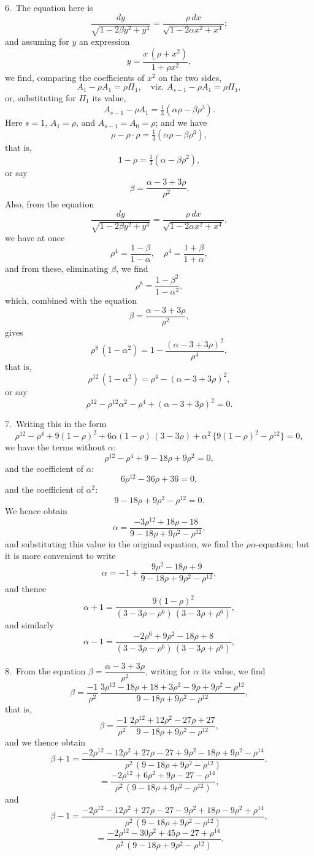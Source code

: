 \documentclass[12pt,a4paper]{article}
\theoremstyle{definition}
\begin{document}
6.\ The equation here is
\[
\frac{dy}{\sqrt{1 - 2\beta y^2 + y^4}}
= \frac{\rho\, dx}{\sqrt{1 - 2\alpha x^2 + x^4}};
\]
and assuming for $y$ an expression
\[
y = \frac{x\, (\rho + x^2)}{1 + \rho x^2},
\]
we find, comparing the coefficients of $x^2$ on the two sides,
\[
A_1 - \rho A_1 = \rho \Pi_1, \quad \text{viz. } A_{s-1} - \rho A_1 = \rho \Pi_1,
\]
or, substituting for $\Pi_1$ its value,
\[
A_{s-1} - \rho A_1 = \tfrac13(\alpha \rho - \beta \rho^3).
\]
Here $s = 1$, $A_1 = \rho$, and $A_{s-1} = A_0 = \rho$; and we have
\[
\rho - \rho \cdot \rho = \tfrac13(\alpha \rho - \beta \rho^3),
\]
that is,
\[
1 - \rho = \tfrac13(\alpha - \beta \rho^2),
\]
or say
\[
\beta = \frac{\alpha - 3 + 3\rho}{\rho^2}.
\]
Also, from the equation
\[
\frac{dy}{\sqrt{1 - 2\beta y^2 + y^4}}
= \frac{\rho\, dx}{\sqrt{1 - 2\alpha x^2 + x^4}},
\]
we have at once
\[
\rho^4 = \frac{1 - \beta}{1 - \alpha}, \quad \rho^4 = \frac{1 + \beta}{1 + \alpha},
\]
and from these, eliminating $\beta$, we find
\[
\rho^8 = \frac{1 - \beta^2}{1 - \alpha^2},
\]
which, combined with the equation
\[
\beta = \frac{\alpha - 3 + 3\rho}{\rho^2},
\]
gives
\[
\rho^8\, (1 - \alpha^2) = 1 - \frac{(\alpha - 3 + 3\rho)^2}{\rho^4},
\]
that is,
\[
\rho^{12}\, (1 - \alpha^2) = \rho^4 - (\alpha - 3 + 3\rho)^2,
\]
or say
\[
\rho^{12} - \rho^{12}\alpha^2 - \rho^4 + (\alpha - 3 + 3\rho)^2 = 0.
\]

7.\ Writing this in the form
\[
\rho^{12} - \rho^4 + 9(1 - \rho)^2 + 6\alpha(1 - \rho)\, (3 - 3\rho) + \alpha^2\, \{9(1 - \rho)^2 - \rho^{12}\} = 0,
\]
we have the terms without $\alpha$:
\[
\rho^{12} - \rho^4 + 9 - 18\rho + 9\rho^2 = 0,
\]
and the coefficient of $\alpha$:
\[
6\rho^{12} - 36\rho + 36 = 0,
\]
and the coefficient of $\alpha^2$:
\[
9 - 18\rho + 9\rho^2 - \rho^{12} = 0.
\]
We hence obtain
\[
\alpha = \frac{-3\rho^{12} + 18\rho - 18}{9 - 18\rho + 9\rho^2 - \rho^{12}},
\]
and substituting this value in the original equation, we find the $\rho\alpha$-equation; but
it is more convenient to write
\[
\alpha = -1 + \frac{9\rho^2 - 18\rho + 9}{9 - 18\rho + 9\rho^2 - \rho^{12}},
\]
and thence
\[
\alpha + 1 = \frac{9(1 - \rho)^2}{(3 - 3\rho - \rho^6)\, (3 - 3\rho + \rho^6)},
\]
and similarly
\[
\alpha - 1 = \frac{-2\rho^6 + 9\rho^2 - 18\rho + 8}{(3 - 3\rho - \rho^6)\, (3 - 3\rho + \rho^6)},
\]

8.\ From the equation $\beta = \dfrac{\alpha - 3 + 3\rho}{\rho^2}$, writing for $\alpha$ its value, we find
\[
\beta = \frac{-1}{\rho^2}\,
\frac{3\rho^{12} - 18\rho + 18 + 3\rho^2 - 9\rho + 9\rho^2 - \rho^{12}}{9 - 18\rho + 9\rho^2 - \rho^{12}},
\]
that is,
\[
\beta = \frac{-1}{\rho^2}\,
\frac{2\rho^{12} + 12\rho^2 - 27\rho + 27}{9 - 18\rho + 9\rho^2 - \rho^{12}},
\]
and we thence obtain
\[
\beta + 1 = \frac{-2\rho^{12} - 12\rho^2 + 27\rho - 27 + 9\rho^2 - 18\rho + 9\rho^2 - \rho^{14}}
{\rho^2\, (9 - 18\rho + 9\rho^2 - \rho^{12})},
\]
\[
= \frac{-2\rho^{12} + 6\rho^2 + 9\rho - 27 - \rho^{14}}
{\rho^2\, (9 - 18\rho + 9\rho^2 - \rho^{12})},
\]
and
\[
\beta - 1 = \frac{-2\rho^{12} - 12\rho^2 + 27\rho - 27 - 9\rho^2 + 18\rho - 9\rho^2 + \rho^{14}}
{\rho^2\, (9 - 18\rho + 9\rho^2 - \rho^{12})},
\]
\[
= \frac{-2\rho^{12} - 30\rho^2 + 45\rho - 27 + \rho^{14}}
{\rho^2\, (9 - 18\rho + 9\rho^2 - \rho^{12})}.
\]
\end{document}
